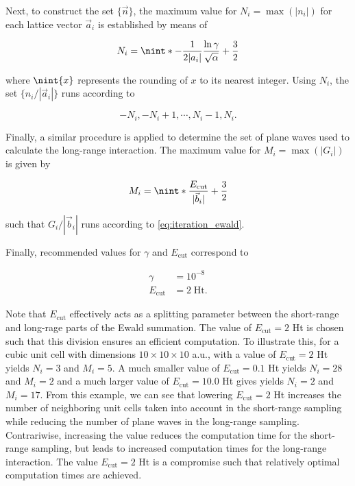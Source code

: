 Next, to construct the set $\{\vec{n}\}$, the maximum value for $N_{i} = \max\left(|n_{i}|\right)$ for each lattice vector $\vec{a}_{i}$ is established by means of

\begin{equation}
    N_{i} = \nint*{-\frac{1}{2 |a_{i}|} \frac{\ln \gamma}{\sqrt{\alpha}} + \frac{3}{2}}
\end{equation}

where $\nint{x}$ represents the rounding of $x$ to its nearest integer. Using $N_{i}$, the set $\{n_{i} / |\vec{a}_{i}|\}$ runs according to

\begin{equation}
    -N_{i}, -N_{i} + 1, \cdots, N_{i}-1, N_{i}.
    \label{eq:iteration_ewald}
\end{equation}

Finally, a similar procedure is applied to determine the set of plane waves used to calculate the long-range interaction. The maximum value for $M_{i} = \max\left(|G_{i}|\right)$ is given by

\begin{equation}
    M_{i} = \nint*{\frac{E_{\text{cut}}}{|\vec{b}_{i}|} + \frac{3}{2}}
\end{equation}

such that $G_{i} / |\vec{b}_{i}|$ runs according to \cref{eq:iteration_ewald}.

Finally, recommended values for $\gamma$ and $E_{\text{cut}}$ correspond to

\begin{align}
    \gamma &= 10^{-8}\\
    E_{\text{cut}} &= 2 \; \text{Ht}.
\end{align}

Note that $E_{\text{cut}}$ effectively acts as a splitting parameter between the short-range and long-rage parts of the Ewald summation. The value of $E_{\text{cut}} = 2$ Ht is chosen such that this division ensures an efficient computation. To illustrate this, for a cubic unit cell with dimensions $10 \times 10 \times 10$ a.u., with a value of $E_{\text{cut}} = 2$ Ht yields $N_{i} = 3$ and $M_{i} = 5$. A much smaller value of $E_{\text{cut}} = 0.1$ Ht yields $N_{i} = 28$ and $M_{i} = 2$ and a much larger value of $E_{\text{cut}} = 10.0$ Ht gives yields $N_{i} = 2$ and $M_{i} = 17$. From this example, we can see that lowering $E_{\text{cut}} = 2$ Ht increases the number of neighboring unit cells taken into account in the short-range sampling while reducing the number of plane waves in the long-range sampling. Contrariwise, increasing the value reduces the computation time for the short-range sampling, but leads to increased computation times for the long-range interaction. The value $E_{\text{cut}} = 2$ Ht is a compromise such that relatively optimal computation times are achieved.